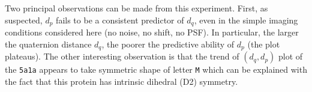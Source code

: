 Two principal observations can be made from this experiment.
First, as suspected, $d_p$ fails to be a consistent predictor of $d_q$, even in the simple imaging conditions considered here (no noise, no shift, no PSF).
In particular, the larger the quaternion distance $d_q$, the poorer the predictive ability of $d_p$ (the plot plateaus).
The other interesting observation is that the trend of $(d_q,d_p)$ plot of the \texttt{5a1a} appears to take symmetric shape of letter \texttt{M} which can be explained with the fact that this protein has intrinsic dihedral (D2) symmetry.


